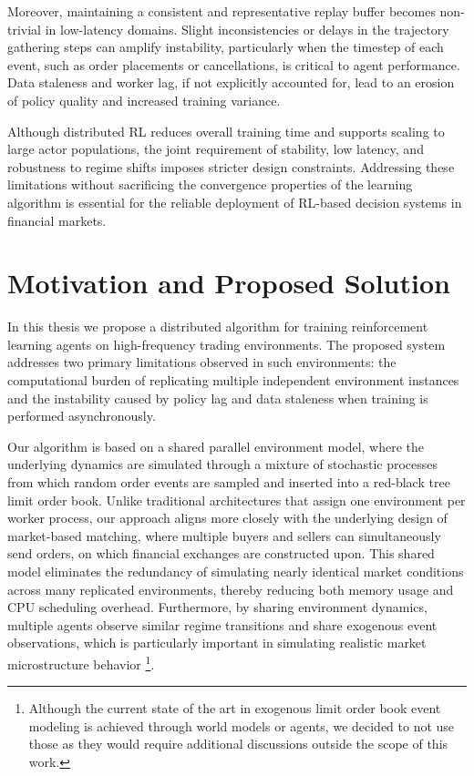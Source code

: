 Moreover, maintaining a consistent and representative replay buffer becomes non-trivial in low-latency domains.
Slight inconsistencies or delays in the trajectory gathering steps can amplify instability,
particularly when the timestep of each event, such as order placements or cancellations, is critical to agent performance.
Data staleness and worker lag, if not explicitly accounted for, lead to an erosion of policy quality and increased training variance.

Although distributed RL reduces overall training time and supports scaling to large actor populations,
the joint requirement of stability, low latency, and robustness to regime shifts imposes stricter design constraints.
Addressing these limitations without sacrificing the convergence properties of the learning algorithm is essential
for the reliable deployment of RL-based decision systems in financial markets.

\section{Motivation and Proposed Solution}
\label{sec:motivation}

In this thesis we propose a distributed algorithm for training reinforcement learning agents on high-frequency trading environments.
The proposed system addresses two primary limitations observed in such environments:
the computational burden of replicating multiple independent environment instances and the instability caused by
policy lag and data staleness when training is performed asynchronously.

Our algorithm is based on a shared parallel environment model, where the underlying dynamics are simulated
through a mixture of stochastic processes from which random order events are sampled and inserted into a red-black tree limit order book.
Unlike traditional architectures that assign one environment per worker process,
our approach aligns more closely with the underlying design of market-based matching,
where multiple buyers and sellers can simultaneously send orders, on which financial exchanges are constructed upon.
This shared model eliminates the redundancy of simulating nearly identical market conditions across many replicated environments,
thereby reducing both memory usage and CPU scheduling overhead.
Furthermore, by sharing environment dynamics, multiple agents observe similar regime transitions and share exogenous event observations,
which is particularly important in simulating realistic market microstructure behavior
\footnote{Although the current state of the art in exogenous limit order book event modeling is achieved through world models or agents,
we decided to not use those as they would require additional discussions outside the scope of this work.}.

